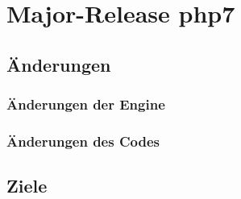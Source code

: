 \chapter{Major-Release php7}\label{ch:php7}

\section{Änderungen}
\subsection{Änderungen der Engine}
\subsection{Änderungen des Codes}

\section{Ziele}